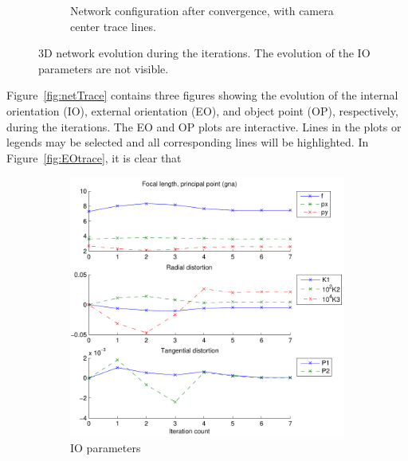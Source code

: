 \documentclass{article}
\begin{document}
\begin{figure}
\begin{subfigure}[b]{0.49\textwidth}
    \caption{Network configuration after convergence, with camera
      center trace lines.}
    \label{fig:camxfinal}
  \end{subfigure}
  \caption{3D network evolution during the iterations. The evolution
    of the IO parameters are not visible.}\label{fig:net3DTrace}
\end{figure}


Figure~\ref{fig:netTrace} contains three figures showing the evolution
of the internal orientation (IO), external orientation (EO), and
object point (OP), respectively, during the iterations. The EO and OP
plots are interactive. Lines in the plots or legends may be selected
and all corresponding lines will be highlighted. In
Figure~\ref{fig:EOtrace}, it is clear that

\begin{figure}
  \centering
  \begin{subfigure}[b]{0.3\textwidth}
    \includegraphics[width=\textwidth]{ill/ccamiotrace}
    \caption{IO parameters}
    \label{fig:IOtrace}
  \end{subfigure}%
  \begin{subfigure}[b]{0.3\textwidth}

\end{subfigure}
\end{figure}
\end{document}
